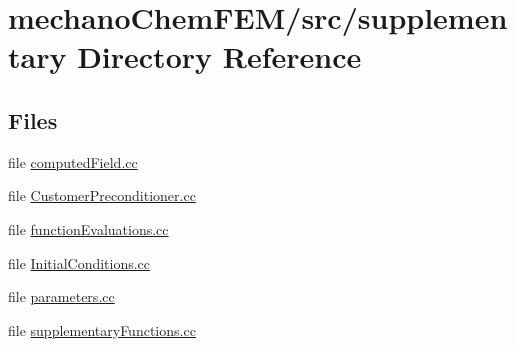 \section{mechano\-Chem\-F\-E\-M/src/supplementary Directory Reference}
\label{dir_e1d5aedda1ba5663936034ac1d492cd1}
\subsection*{Files}
\begin{DoxyCompactItemize}
\item 
file \hyperlink{computed_field_8cc}{computed\-Field.\-cc}
\item 
file \hyperlink{_customer_preconditioner_8cc}{Customer\-Preconditioner.\-cc}
\item 
file \hyperlink{function_evaluations_8cc}{function\-Evaluations.\-cc}
\item 
file \hyperlink{_initial_conditions_8cc}{Initial\-Conditions.\-cc}
\item 
file \hyperlink{parameters_8cc}{parameters.\-cc}
\item 
file \hyperlink{supplementary_functions_8cc}{supplementary\-Functions.\-cc}
\end{DoxyCompactItemize}
